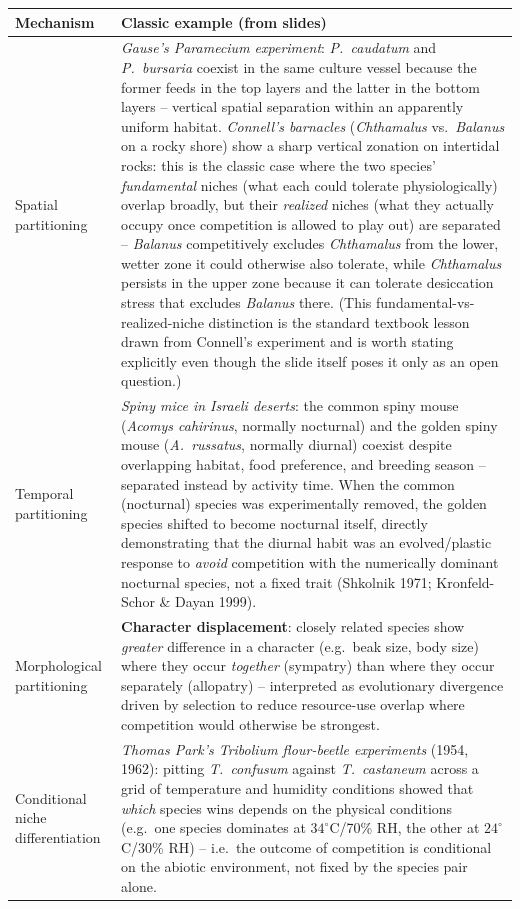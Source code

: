 \documentclass[11pt,a4paper]{article}
\begin{document}
\begin{center}
\begin{tabularx}{\textwidth}{@{}l X@{}}
\toprule
\textbf{Mechanism} & \textbf{Classic example (from slides)} \\
\midrule
Spatial partitioning & \emph{Gause's Paramecium experiment}: \textit{P.\ caudatum} and \textit{P.\ bursaria} coexist in the same culture vessel because the former feeds in the top layers and the latter in the bottom layers -- vertical spatial separation within an apparently uniform habitat. \emph{Connell's barnacles} (\textit{Chthamalus} vs.\ \textit{Balanus} on a rocky shore) show a sharp vertical zonation on intertidal rocks: this is the classic case where the two species' \emph{fundamental} niches (what each could tolerate physiologically) overlap broadly, but their \emph{realized} niches (what they actually occupy once competition is allowed to play out) are separated -- \textit{Balanus} competitively excludes \textit{Chthamalus} from the lower, wetter zone it could otherwise also tolerate, while \textit{Chthamalus} persists in the upper zone because it can tolerate desiccation stress that excludes \textit{Balanus} there. (This fundamental-vs-realized-niche distinction is the standard textbook lesson drawn from Connell's experiment and is worth stating explicitly even though the slide itself poses it only as an open question.) \\
Temporal partitioning & \emph{Spiny mice in Israeli deserts}: the common spiny mouse (\textit{Acomys cahirinus}, normally nocturnal) and the golden spiny mouse (\textit{A.\ russatus}, normally diurnal) coexist despite overlapping habitat, food preference, and breeding season -- separated instead by activity time. When the common (nocturnal) species was experimentally removed, the golden species shifted to become nocturnal itself, directly demonstrating that the diurnal habit was an evolved/plastic response to \emph{avoid} competition with the numerically dominant nocturnal species, not a fixed trait (Shkolnik 1971; Kronfeld-Schor \& Dayan 1999). \\
Morphological partitioning & \textbf{Character displacement}: closely related species show \emph{greater} difference in a character (e.g.\ beak size, body size) where they occur \emph{together} (sympatry) than where they occur separately (allopatry) -- interpreted as evolutionary divergence driven by selection to reduce resource-use overlap where competition would otherwise be strongest. \\
Conditional niche differentiation & \emph{Thomas Park's \textit{Tribolium} flour-beetle experiments} (1954, 1962): pitting \textit{T.\ confusum} against \textit{T.\ castaneum} across a grid of temperature and humidity conditions showed that \emph{which} species wins depends on the physical conditions (e.g.\ one species dominates at $34^{\circ}$C/70\% RH, the other at $24^{\circ}$C/30\% RH) -- i.e.\ the outcome of competition is conditional on the abiotic environment, not fixed by the species pair alone. \\
\bottomrule
\end{tabularx}
\end{center}
\end{document}
